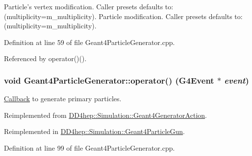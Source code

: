 Particle's vertex modification. Caller presets defaults to: (multiplicity=m\_\-multiplicity). Particle modification. Caller presets defaults to: (multiplicity=m\_\-multiplicity). 

Definition at line 59 of file Geant4ParticleGenerator.cpp.

Referenced by operator()().\hypertarget{class_d_d4hep_1_1_simulation_1_1_geant4_particle_generator_a4b7c8fdbc6fdc0c79efdf112c8ede315}{
\subsubsection[{operator()}]{\setlength{\rightskip}{0pt plus 5cm}void Geant4ParticleGenerator::operator() (G4Event $\ast$ {\em event})}}
\label{class_d_d4hep_1_1_simulation_1_1_geant4_particle_generator_a4b7c8fdbc6fdc0c79efdf112c8ede315}


\hyperlink{class_d_d4hep_1_1_callback}{Callback} to generate primary particles. 

Reimplemented from \hyperlink{class_d_d4hep_1_1_simulation_1_1_geant4_generator_action_ac5a1d2335a19e3f9d555081199e01801}{DD4hep::Simulation::Geant4GeneratorAction}.

Reimplemented in \hyperlink{class_d_d4hep_1_1_simulation_1_1_geant4_particle_gun_a4e68905424d21f2386d24d3cbaf795f1}{DD4hep::Simulation::Geant4ParticleGun}.

Definition at line 99 of file Geant4ParticleGenerator.cpp.

